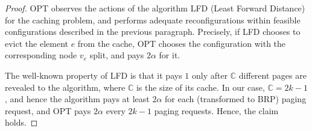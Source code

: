 \documentclass[manuscript,screen=true, review, anonymous]{acmart}
\begin{document}
\begin{proof}
OPT observes the actions of the algorithm LFD (Least Forward Distance) for the caching problem, and performs adequate reconfigurations within feasible configurations described in the previous paragraph.
Precisely, if LFD chooses to evict the element $e$ from the cache, OPT chooses the configuration with the corresponding node $v_e$ split, and pays $2\alpha$ for it.

The well-known property of LFD is that it pays $1$ only after $\mathbb{C}$ different pages are revealed to the algorithm, where $\mathbb{C}$ is the size of its cache.
In our case, $\mathbb{C} = 2k-1$, and hence the algorithm pays at least $2\alpha$ for each (transformed to BRP) paging request, and OPT pays $2\alpha$ every $2k-1$ paging requests.
Hence, the claim holds.
\end{proof}
\end{document}

